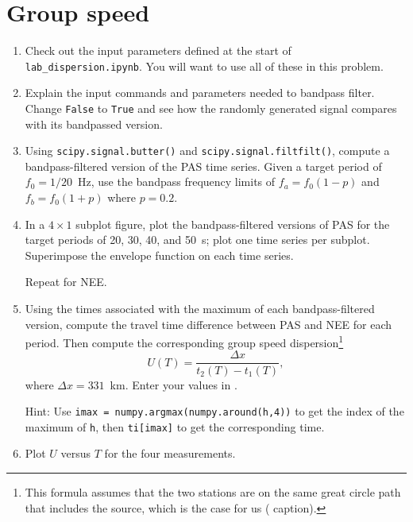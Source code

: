 \documentclass[11pt,titlepage,fleqn]{article}
\begin{document}

\section{Group speed}

\begin{enumerate}
\item Check out the input parameters defined at the start of \verb+lab_dispersion.ipynb+. You will want to use all of these in this problem.

\item Explain the input commands and parameters needed to bandpass filter. Change \verb+False+ to \verb+True+ and see how the randomly generated signal compares with its bandpassed version.


\item Using \verb+scipy.signal.butter()+ and \verb+scipy.signal.filtfilt()+, compute a bandpass-filtered version of the PAS time series. Given a target period of $f_0 = 1/20$~Hz, use the bandpass frequency limits of $f_a = f_0(1-p)$ and $f_b = f_0(1+p)$ where $p = 0.2$.

\item In a $4 \times 1$ subplot figure, plot the bandpass-filtered versions of PAS for the target periods of 20, 30, 40, and 50~s; plot one time series per subplot. Superimpose the envelope function on each time series.

Repeat for NEE.

\item Using the times associated with the maximum of each bandpass-filtered version, compute the travel time difference between PAS and NEE for each period. Then compute the corresponding group speed dispersion\footnote{This formula assumes that the two stations are on the same great circle path that includes the source, which is the case for us ( caption).}
%
\begin{equation}
U(T) = \frac{\Delta x}{t_2(T) - t_1(T)},
\label{group}
\end{equation}
%
where $\Delta x = 331$~km. Enter your values in .

Hint: Use \verb+imax = numpy.argmax(numpy.around(h,4))+ to get the index of the maximum of \verb+h+, then \verb+ti[imax]+ to get the corresponding time.

\item Plot $U$ versus $T$ for the four measurements.
\end{enumerate}
\end{document}
